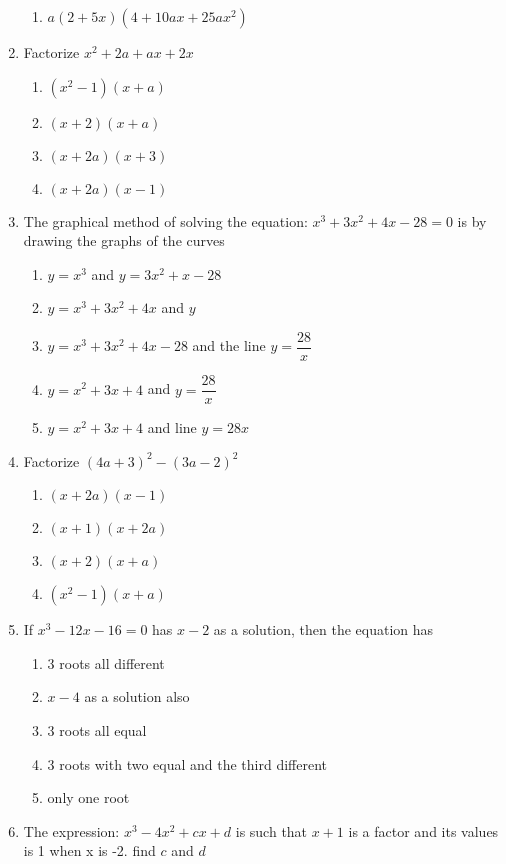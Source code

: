 \begin{multicols}{2}
\begin{enumerate}[label={\arabic*.}]
\begin{enumerate}[label={\Alph*.}]
	\item \(a(2+5x)(4+10ax+25a{x}^{2})\)
	\end{enumerate}
\item Factorize \({x}^{2}+2a+ax+2x\)
	\begin{enumerate}[label={\Alph*.}]
	\item \(({x}^{2}-1)(x+a)\)
	\item \((x+2)(x+a)\)
	\item \((x+2a)(x+3)\)
	\item \((x+2a)(x-1)\)
	\end{enumerate}
\item The graphical method of solving the equation: \({x}^{3}+3{x}^{2}+4x-28 = 0\) is by drawing the graphs of the curves
	\begin{enumerate}[label={\Alph*.}]
	\item \(y = {x}^{3}\) and \(y=3{x}^{2} + x -28\)
	\item \(y={x}^{3}+3{x}^{2}+4x\) and \(y\)
	\item \(y={x}^{3}+3{x}^{2}+4x-28\) and the line \(y=\dfrac{28}{x}\)
	\item \(y={x}^{2}+3x+4\) and \(y=\dfrac{28}{x}\)
	\item \(y={x}^{2}+3x+4\) and line \(y=28x\)
	\end{enumerate}
\item Factorize \((4a+3)^2-(3a-2)^2\)
	\begin{enumerate}[label={\Alph*.}]
	\item \((x+2a)(x-1)\)
	\item \((x+1)(x+2a)\)
	\item \((x+2)(x+a)\)
	\item \(({x}^{2}-1)(x+a)\)
	\end{enumerate}
\item If \({x}^{3} - 12x - 16 = 0\) has \(x-2\) as a solution, then the equation has
	\begin{enumerate}[label={\Alph*.}]
	\item 3 roots all different
	\item \(x-4\) as a solution also
	\item 3 roots all equal
	\item 3 roots with two equal and the third different
	\item only one root
	\end{enumerate}
\item The expression: \({x}^{3}-4{x}^{2}+cx+d\) is such that \(x+1\) is a factor and its values is 1 when x is -2. find \(c\) and \(d\)

\end{enumerate}
\end{multicols}
